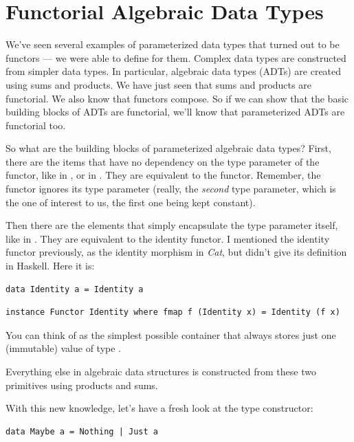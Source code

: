 \section{Functorial Algebraic Data
Types}\label{functorial-algebraic-data-types}

We've seen several examples of parameterized data types that turned out
to be functors --- we were able to define  for them.
Complex data types are constructed from simpler data types. In
particular, algebraic data types (ADTs) are created using sums and
products. We have just seen that sums and products are functorial. We
also know that functors compose. So if we can show that the basic
building blocks of ADTs are functorial, we'll know that parameterized
ADTs are functorial too.

So what are the building blocks of parameterized algebraic data types?
First, there are the items that have no dependency on the type parameter
of the functor, like  in , or 
in . They are equivalent to the  functor.
Remember, the  functor ignores its type parameter (really,
the \emph{second} type parameter, which is the one of interest to us,
the first one being kept constant).

Then there are the elements that simply encapsulate the type parameter
itself, like  in . They are equivalent to the
identity functor. I mentioned the identity functor previously, as the
identity morphism in \emph{Cat}, but didn't give its definition in
Haskell. Here it is:

\begin{verbatim}
data Identity a = Identity a
\end{verbatim}

\begin{verbatim}
instance Functor Identity where fmap f (Identity x) = Identity (f x)
\end{verbatim}

You can think of  as the simplest possible container
that always stores just one (immutable) value of type .

Everything else in algebraic data structures is constructed from these
two primitives using products and sums.

With this new knowledge, let's have a fresh look at the 
type constructor:

\begin{verbatim}
data Maybe a = Nothing | Just a
\end{verbatim}

